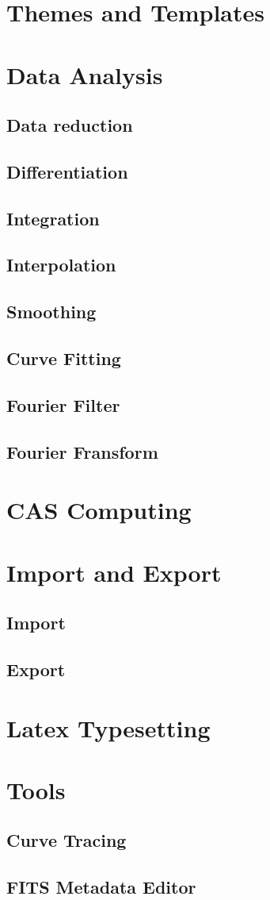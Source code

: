 \chapter{Themes and Templates}


\chapter{Data Analysis}
\section{Data reduction}
\section{Differentiation}
\section{Integration}
\section{Interpolation}
\section{Smoothing}
\section{Curve Fitting}
\section{Fourier Filter}
\section{Fourier Fransform}

\chapter{CAS Computing}

\chapter{Import and Export}
\section{Import}
\section{Export}

\chapter{Latex Typesetting}

\chapter{Tools}
\section{Curve Tracing}
\section{FITS Metadata Editor}
